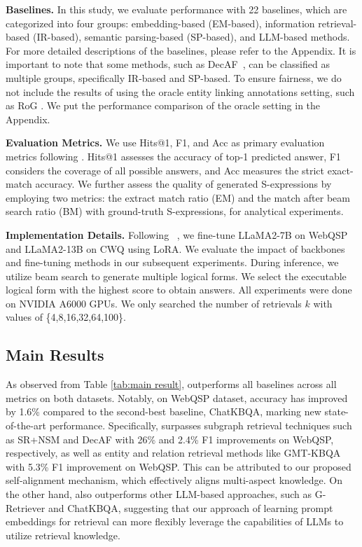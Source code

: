 \noindent\textbf{Baselines.}
In this study, we evaluate performance with 22 baselines, which are categorized into four groups: embedding-based (EM-based), information retrieval-based (IR-based), semantic parsing-based (SP-based), and LLM-based methods. For more detailed descriptions of the baselines, please refer to the Appendix.
It is important to note that some methods, such as DecAF~\cite{decaf}, can be classified as multiple groups, specifically IR-based and SP-based. To ensure fairness, we do not include the results of using the oracle entity linking annotations setting, such as RoG \cite{RoG}. We put the performance comparison of the oracle setting in the Appendix.





\noindent\textbf{Evaluation Metrics.}
We use Hits@1, F1, and Acc as primary evaluation metrics following \cite{chatkbqa}. Hits@1 assesses the accuracy of top-1 predicted answer, F1 considers the coverage of all possible answers, and Acc measures the strict exact-match accuracy.
We further assess the quality of generated S-expressions by employing two metrics: the extract match ratio (EM) and the match after beam search ratio (BM) with ground-truth S-expressions, for analytical experiments.

\noindent\textbf{Implementation Details.}
Following ~\citet{chatkbqa}, we fine-tune LLaMA2-7B on WebQSP and LLaMA2-13B on CWQ using LoRA.
We evaluate the impact of backbones and fine-tuning methods in our subsequent experiments. During inference, we utilize beam search to generate multiple logical forms. We select the executable logical form with the highest score to obtain answers. All experiments were done on NVIDIA A6000 GPUs. We only searched the number of retrievals $k$ with values of \{4,8,16,32,64,100\}. 

\subsection{Main Results}
As observed from Table \ref{tab:main result}, \model outperforms all baselines across all metrics on both datasets. Notably, on WebQSP dataset, accuracy has improved by 1.6\% compared to the second-best baseline, ChatKBQA, marking new state-of-the-art performance.
Specifically, \model surpasses subgraph retrieval techniques such as SR+NSM and DecAF with 26\% and 2.4\% F1 improvements on WebQSP, respectively, as well as entity and relation retrieval methods like GMT-KBQA with 5.3\% F1 improvement on WebQSP.
This can be attributed to our proposed self-alignment mechanism, which effectively aligns multi-aspect knowledge.
On the other hand, \model also outperforms other LLM-based approaches, such as G-Retriever and ChatKBQA, suggesting that our approach of learning prompt embeddings for retrieval can more flexibly leverage the capabilities of LLMs to utilize retrieval knowledge.



